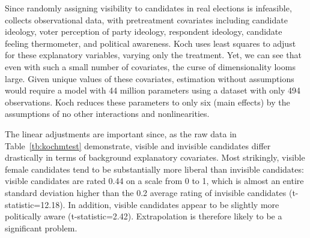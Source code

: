 \documentclass[11pt,titlepage]{article}
\begin{document}
Since randomly assigning visibility to candidates in real elections is
infeasible, \citet{Koch02} collects observational data, with
pretreatment covariates including candidate ideology, voter perception
of party ideology, respondent ideology, candidate feeling thermometer,
and political awareness.  Koch uses least squares to adjust for these
explanatory variables, varying only the treatment.  Yet, we can see
that even with such a small number of covariates, the curse of
dimensionality looms large.  Given unique values of these covariates,
estimation without assumptions would require a model with 44 million
parameters using a dataset with only 494 observations.  Koch reduces
these parameters to only six (main effects) by the assumptions of no
other interactions and nonlinearities.

The linear adjustments are important since, as the raw data in
Table~\ref{tb:kochmtest} demonstrate, visible and invisible candidates
differ drastically in terms of background explanatory covariates.
Most strikingly, visible female candidates tend to be substantially
more liberal than invisible candidates: visible candidates are rated
0.44 on a scale from 0 to 1, which is almost an entire standard
deviation higher than the 0.2 average rating of invisible candidates
(t-statistic=12.18).  In addition, visible candidates appear to be
slightly more politically aware (t-statistic=2.42).  Extrapolation is
therefore likely to be a significant problem.
\end{document}
